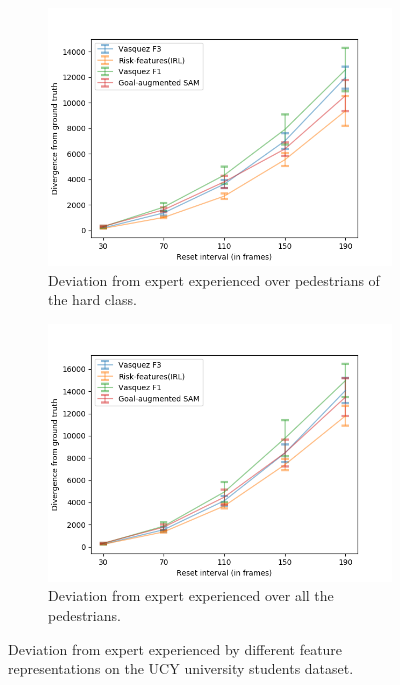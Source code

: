 \begin{figure}[htbp]
\begin{subfigure}{0.5\textwidth}
		\label{fig:inter_IRL-drift_analysis_med}
	\end{subfigure}
	\begin{subfigure}{0.5\textwidth}
		\centering
		\includegraphics[width=\linewidth]{plots/plot_without_outliers/ucy_inter_irl_no_outliers/ucy_irl_hard.png}
		\caption {Deviation from expert experienced over pedestrians of the hard class.}
		\label{fig:inter_IRL-drift_analysis_hard}
	\end{subfigure}
	\begin{subfigure}{0.5\textwidth}
		\centering
		\includegraphics[width=\linewidth]{plots/plot_without_outliers/ucy_inter_irl_no_outliers/ucy_irl_all.png}
		\caption {Deviation from expert experienced over all the pedestrians.}
		\label{fig:inter_IRL-drift_analysis_all}
	\end{subfigure}
	\caption{Deviation from expert experienced by different feature representations on the UCY university students dataset.}
\end{figure}


